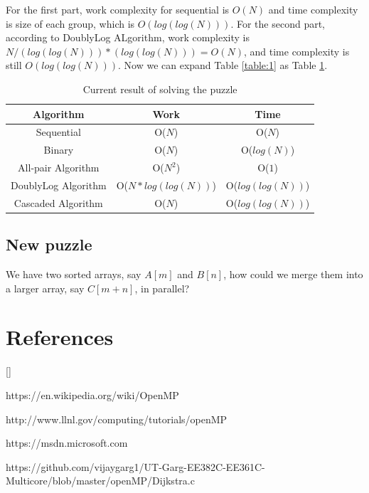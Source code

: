 \documentclass[twoside]{article}
\def\beginrefs{\begin{list}%
        {[\arabic{equation}]}{\usecounter{equation}
         \setlength{\leftmargin}{2.0truecm}\setlength{\labelsep}{0.4truecm}%
         \setlength{\labelwidth}{1.6truecm}}}
\def\endrefs{\end{list}}
\def\bibentry#1{\item[\hbox{[#1]}]}
\begin{document}
For the first part, work complexity for sequential is $O(N)$ and time complexity is size of each group, which is $O(log(log(N)))$. For the second part, according to DoublyLog ALgorithm, work complexity is $N/(log(log(N)))*(log(log(N)))=O(N)$, and time complexity is still $O(log(log(N)))$.
Now we can expand Table \ref{table:1} as Table \ref{table:2}.
\begin{table}[H]
    \centering
    \begin{tabular}{ |c||c|c| } 
        \hline
        Algorithm & Work & Time \\
        \hline
        \hline
        Sequential & O($N$) & O($N$) \\ 
        \hline
        Binary & O($N$) & O($log(N)$) \\ 
        \hline
        All-pair Algorithm & O($N^2$) & O($1$) \\   
        \hline
        \hline
        DoublyLog Algorithm & O($N*log(log(N))$) & O($log(log(N))$) \\   
        \hline
        Cascaded Algorithm & O($N$) & O($log(log(N))$) \\   
        \hline
    \end{tabular}
    \caption{Current result of solving the puzzle}
    \label{table:2}
\end{table}

\subsection{New puzzle}
We have two sorted arrays, say $A[m]$ and $B[n]$, how could we merge them into a larger array, say $C[m+n]$, in parallel?

\section*{References}
\beginrefs
\bibentry{1} https://en.wikipedia.org/wiki/OpenMP
\bibentry{2} http://www.llnl.gov/computing/tutorials/openMP
\bibentry{3} https://msdn.microsoft.com
\bibentry{4} https://github.com/vijaygarg1/UT-Garg-EE382C-EE361C-Multicore/blob/master/openMP/Dijkstra.c
\endrefs
\end{document}

